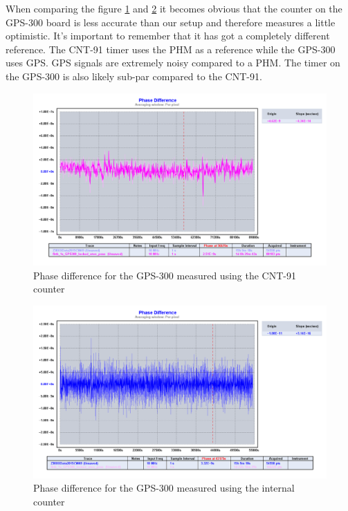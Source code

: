 \documentclass[11pt,english,a4paper]{article}
\begin{document}
When comparing the figure \ref{fig:part1_spm3_fbtb_phase_diff} and \ref{fig:part1_spm3_x38_phase_diff} it becomes obvious that the counter on the GPS-300 board is less accurate than our setup and therefore measures a little optimistic. It's important to remember that it has got a completely different reference. The CNT-91 timer uses the PHM as a reference while the GPS-300 uses GPS. GPS signals are extremely noisy compared to a PHM. The timer on the GPS-300 is also likely sub-par compared to the CNT-91. 

\begin{figure}[!htb]
  \centering
    \includegraphics[width=1\textwidth]{part1_spm3_fbtb_phase_diff.png}
      \caption{Phase difference for the GPS-300 measured using the CNT-91 counter}
          \label{fig:part1_spm3_fbtb_phase_diff}
\end{figure}

\begin{figure}[!htb]
  \centering
    \includegraphics[width=1\textwidth]{part1_spm3_x38_phase_diff.png}
      \caption{Phase difference for the GPS-300 measured using the internal counter}
          \label{fig:part1_spm3_x38_phase_diff}
\end{figure}
\end{document}
